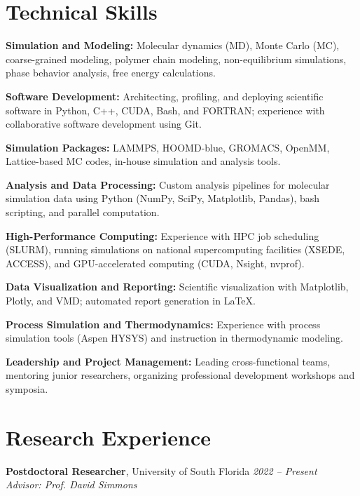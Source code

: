 \documentclass[letterpaper,12pt]{article}
\begin{document}
\section*{Technical Skills}
\begin{tabitemize}
    \item \textbf{Simulation and Modeling:} Molecular dynamics (MD), Monte Carlo (MC), coarse-grained modeling, polymer chain modeling, non-equilibrium simulations, phase behavior analysis, free energy calculations.
    \item \textbf{Software Development:} Architecting, profiling, and deploying scientific software in Python, C++, CUDA, Bash, and FORTRAN; experience with collaborative software development using Git.
    \item \textbf{Simulation Packages:} LAMMPS, HOOMD-blue, GROMACS, OpenMM, Lattice-based MC codes, in-house simulation and analysis tools.
    \item \textbf{Analysis and Data Processing:} Custom analysis pipelines for molecular simulation data using Python (NumPy, SciPy, Matplotlib, Pandas), bash scripting, and parallel computation.
    \item \textbf{High-Performance Computing:} Experience with HPC job scheduling (SLURM), running simulations on national supercomputing facilities (XSEDE, ACCESS), and GPU-accelerated computing (CUDA, Nsight, nvprof).
    \item \textbf{Data Visualization and Reporting:} Scientific visualization with Matplotlib, Plotly, and VMD; automated report generation in LaTeX.
    \item \textbf{Process Simulation and Thermodynamics:} Experience with process simulation tools (Aspen HYSYS) and instruction in thermodynamic modeling.
    \item \textbf{Leadership and Project Management:} Leading cross-functional teams, mentoring junior researchers, organizing professional development workshops and symposia.
\end{tabitemize}


\vspace{-0.3\baselineskip}
\section*{Research Experience}

\textbf{Postdoctoral Researcher}, University of South Florida \hfill \textit{2022 – Present} \\
\textit{Advisor: Prof. David Simmons}
\vspace{0.5em}
\end{document}
